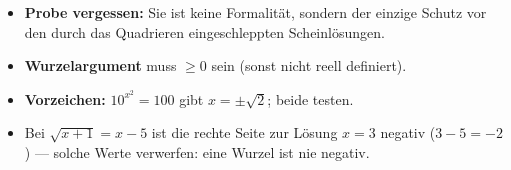 \begin{achtung}
\begin{itemize}
  \item \textbf{Probe vergessen:} Sie ist keine Formalität, sondern der
        einzige Schutz vor den durch das Quadrieren eingeschleppten
        Scheinlösungen.
  \item \textbf{Wurzelargument} muss $\ge0$ sein (sonst nicht reell
        definiert).
  \item \textbf{Vorzeichen:} $10^{x^2}=100$ gibt $x=\pm\sqrt2$; beide
        testen.
  \item Bei $\sqrt{x+1}=x-5$ ist die rechte Seite zur Lösung $x=3$
        negativ ($3-5=-2$) --- solche Werte verwerfen: eine Wurzel ist
        nie negativ.
\end{itemize}
\end{achtung}
